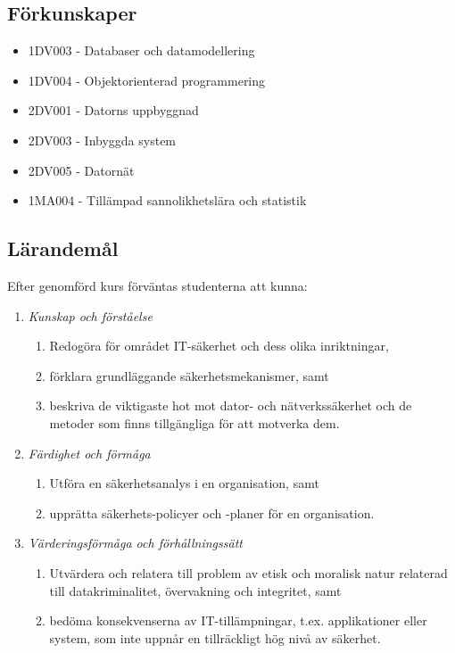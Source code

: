\subsection*{Förkunskaper}

\begin{itemize}
\tightlist
\item
  1DV003 - Databaser och datamodellering
\item
  1DV004 - Objektorienterad programmering
\item
  2DV001 - Datorns uppbyggnad
\item
  2DV003 - Inbyggda system
\item
  2DV005 - Datornät
\item
  1MA004 - Tillämpad sannolikhetslära och statistik
\end{itemize}

\subsection*{Lärandemål}

Efter genomförd kurs förväntas studenterna att kunna:

\begin{enumerate}
\def\labelenumi{\Alph{enumi}.}
\tightlist
\item
  \emph{Kunskap och förståelse}

  \begin{enumerate}
  \def\labelenumii{\Alph{enumi}.\arabic{enumii}.}
  \tightlist
  \item
    Redogöra för området IT­-säkerhet och dess olika inriktningar,
  \item
    förklara grundläggande säkerhetsmekanismer, samt
  \item
    beskriva de viktigaste hot mot dator- och nätverkssäkerhet och de
    metoder som finns tillgängliga för att motverka dem.
  \end{enumerate}
\item
  \emph{Färdighet och förmåga}

  \begin{enumerate}
  \def\labelenumii{\Alph{enumi}.\arabic{enumii}.}
  \tightlist
  \item
    Utföra en säkerhetsanalys i en organisation, samt
  \item
    upprätta säkerhets-policyer och -planer för en organisation.
  \end{enumerate}
\item
  \emph{Värderingsförmåga och förhållningssätt}

  \begin{enumerate}
  \def\labelenumii{\Alph{enumi}.\arabic{enumii}.}
  \tightlist
  \item
    Utvärdera och relatera till problem av etisk och moralisk natur
    relaterad till datakriminalitet, övervakning och integritet, samt
  \item
    bedöma konsekvenserna av IT-tillämpningar, t.ex. applikationer eller
    system, som inte uppnår en tillräckligt hög nivå av säkerhet.
  \end{enumerate}
\end{enumerate}

